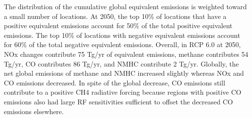 The distribution of the cumulative global equivalent emissions is weighted toward a small number of locations. At 2050, the top 10\% of locations that have a positive equivalent emissions account for 50\% of the total positive equivalent emissions. The top 10\% of locations with negative equivalent emissions account for 60\% of the total negative equivalent emissions. Overall, in RCP 6.0 at 2050, NOx changes contribute 75 Tg/yr of equivalent emissions, methane contributes 54 Tg/yr, CO contributes 86 Tg/yr, and NMHC contribute 2 Tg/yr. Globally, the net global emissions of methane and NMHC increased slightly whereas NOx and CO emissions decreased. In spite of the global decrease, CO emissions still contribute to a positive CH4 radiative forcing because regions with positive CO emissions also had large RF sensitivities sufficient to offset the decreased CO emissions elsewhere.

